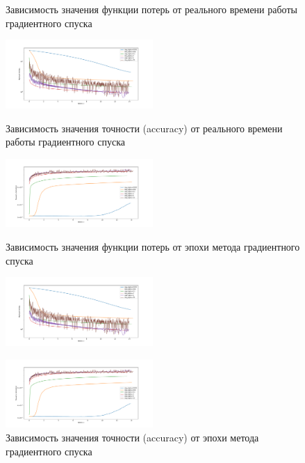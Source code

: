 \documentclass[a4paper, 11pt]{article}
\begin{document}
            \begin{figure}[H] \label{exp1}
                \begin{multicols}{2}
                    \begin{center}
                        \caption{Зависимость значения функции потерь от реального времени работы градиентного спуска} \label{exp1:sgd_func_time}
                        \includegraphics[width=0.5\textwidth, height=0.25\textheight]{../graphs/exp1_func_GD_alpha_time_beta=0,001.pdf}
                        
                        \caption{Зависимость значения точности (accuracy) от реального времени работы градиентного спуска} \label{exp1:sgd_acc_time}
                        \includegraphics[width=0.5\textwidth, height=0.25\textheight]{../graphs/exp1_accuracy_GD_alpha_time_beta=0,001.pdf}
                        
                        \caption{Зависимость значения функции потерь от эпохи метода градиентного спуска} \label{exp1:sgd_func_iter}
                        \includegraphics[width=0.5\textwidth, height=0.25\textheight]{../graphs/exp1_func_GD_alpha_time_beta=0,001.pdf}
                        
                        \caption{Зависимость значения точности (accuracy) от эпохи метода градиентного спуска} \label{exp1:sgd_acc_iter}
                        \includegraphics[width=0.5\textwidth, height=0.25\textheight]{../graphs/exp1_accuracy_GD_alpha_time_beta=0,001.pdf}
                    \end{center}
                \end{multicols}
            \end{figure}
\end{document}
